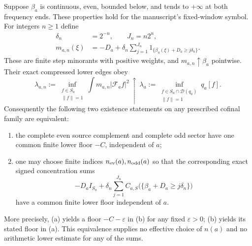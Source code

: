 \begin{proposition}
\label{ns43-conc-prop-adaptive}
Suppose $\beta_a$ is continuous, even, bounded below, and tends to
$+\infty$ at both frequency ends. These properties hold for the
manuscript's fixed-window symbol. For integers $n\ge1$ define
\begin{align*}
 \delta_n&=2^{-n},\qquad J_n=n2^n,\\
 m_{a,n}(\xi)&=-D_a+
 \delta_n\sum_{j=1}^{J_n}
       1_{\{\beta_a(\xi)+D_a\ge j\delta_n\}}.
\end{align*}
These are finite step minorants with positive weights, and
$m_{a,n}\uparrow\beta_a$ pointwise. Their exact compressed lower
edges obey
\begin{equation}\label{ns43-conc-eq-edge-limit}
 \lambda_{a,n}:=\inf_{\substack{f\in S_a\\\|f\|=1}}
   \int m_{a,n}|\mathcal F_af|^2
 \ \uparrow\
 \lambda_a:=\inf_{\substack{f\in S_a\cap\mathcal D(q_a)\\\|f\|=1}}
   q_a[f].
\end{equation}
Consequently the following two existence statements on any prescribed
cofinal family are equivalent:
\begin{enumerate}[label=(\alph*)]
\item the complete even source complement and complete odd sector
have one common finite lower floor $-C$, independent of $a$;
\item one may choose finite indices $n_{\rm ev}(a),n_{\rm odd}(a)$
so that the corresponding exact signed concentration sums
\[
 -D_a I_{S_a}+\delta_n\sum_{j=1}^{J_n}
 C_{a,S}\bigl(\{\beta_a+D_a\ge j\delta_n\}\bigr)
\]
have a common finite lower floor independent of $a$.
\end{enumerate}
More precisely, (a) yields a floor $-C-\varepsilon$ in (b) for any
fixed $\varepsilon>0$; (b) yields its stated floor in (a).
This equivalence supplies no effective choice of $n(a)$ and no
arithmetic lower estimate for any of the sums.
\end{proposition}
